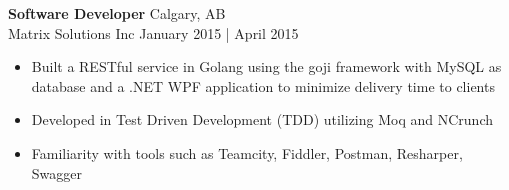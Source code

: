 \documentclass[a4paper]{article}
\begin{document}
\textbf{\normalsize Software Developer} \hfill Calgary, AB\\
\textcolor{jobGray}{Matrix Solutions Inc} \hfill \textcolor{dateGray}{January 2015 | April 2015}\\
\vspace{-2mm}
\begin{itemize}[leftmargin=1cm ]\itemsep -0.5pt
	\item Built a RESTful service in Golang using the goji framework with MySQL as database and a .NET WPF application to minimize delivery time to clients
	\item Developed in Test Driven Development (TDD) utilizing Moq and NCrunch
	\item Familiarity with tools such as Teamcity, Fiddler, Postman, Resharper, Swagger
\end{itemize}
\end{document}
